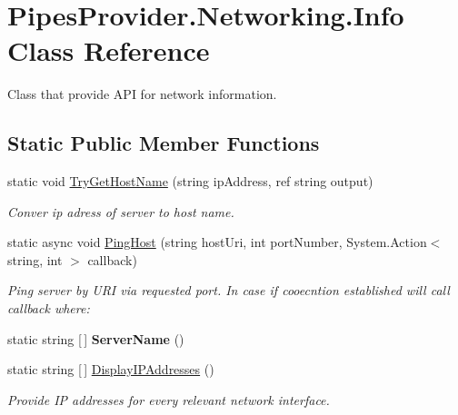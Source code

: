 \hypertarget{class_pipes_provider_1_1_networking_1_1_info}{}\section{Pipes\+Provider.\+Networking.\+Info Class Reference}
\label{class_pipes_provider_1_1_networking_1_1_info}


Class that provide A\+PI for network information.  


\subsection*{Static Public Member Functions}
\begin{DoxyCompactItemize}
\item 
static void \mbox{\hyperlink{class_pipes_provider_1_1_networking_1_1_info_af2fa3a471e2f6245bed859c86b6f0c0e}{Try\+Get\+Host\+Name}} (string ip\+Address, ref string output)
\begin{DoxyCompactList}\small\item\em Conver ip adress of server to host name. \end{DoxyCompactList}\item 
static async void \mbox{\hyperlink{class_pipes_provider_1_1_networking_1_1_info_aa609196312941e05536dcb3526b9a2ce}{Ping\+Host}} (string host\+Uri, int port\+Number, System.\+Action$<$ string, int $>$ callback)
\begin{DoxyCompactList}\small\item\em Ping server by U\+RI via requested port. In case if cooecntion established will call callback where\+: \end{DoxyCompactList}\item 
\mbox{\label{class_pipes_provider_1_1_networking_1_1_info_a3bc757d31da1bf0759a252ee0f919917}} 
static string \mbox{[}$\,$\mbox{]} {\bfseries Server\+Name} ()
\item 
static string \mbox{[}$\,$\mbox{]} \mbox{\hyperlink{class_pipes_provider_1_1_networking_1_1_info_ac8097e6a6bccbeae15e309ce72dbac91}{Display\+I\+P\+Addresses}} ()
\begin{DoxyCompactList}\small\item\em Provide IP addresses for every relevant network interface. \end{DoxyCompactList}\end{DoxyCompactItemize}
